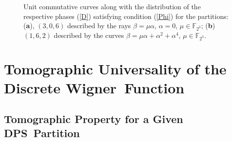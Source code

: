 \documentclass[quantumrep,article,accept,pdftex,moreauthors]{Definitions/mdpi}
\begin{document}
\begin{figure}[H]
 \hspace{-15pt} 
  \caption{
    Unit commutative curves along with the distribution of the respective phases
    (\ref{D}) satisfying  condition (\ref{Phi}) for the partitions: (\textbf{a}),
    $(3,0,6)$ described by the rays $\beta = \mu \alpha$, $\alpha = 0$, $\mu \in
    \mathbb F_{2^{3}}$; (\textbf{b})~$(1,6,2)$ described by the curves $\beta = \mu
    \alpha + \alpha^2 + \alpha^{4}$, $\mu \in \mathbb F_{2^{3}}$.
  }
  \label{fig1}
\end{figure}

\section{Tomographic Universality of the Discrete Wigner~Function\label{sec:4}}
\unskip

\subsection{Tomographic Property for a Given DPS~Partition}
\end{document}
